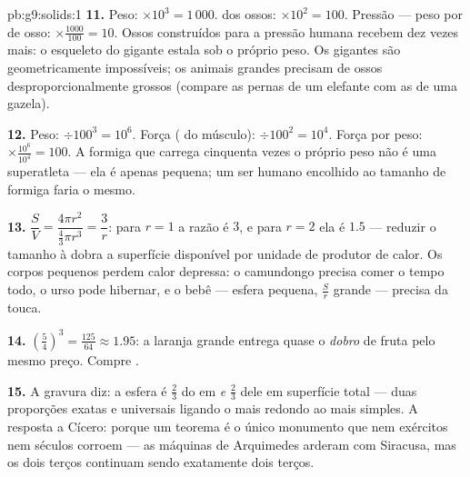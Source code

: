 \begin{solution}{pb:g9:solids:1}
\textbf{11.} Peso: $\times 10^3 = 1\,000$.  dos ossos:
$\times 10^2 = 100$. Pressão --- peso por  de osso:
$\times \frac{1000}{100} = 10$. Ossos construídos para a pressão humana
recebem dez vezes mais: o esqueleto do gigante estala sob o próprio
peso. Os gigantes são geometricamente impossíveis; os animais grandes
precisam de ossos desproporcionalmente grossos (compare as pernas de um
elefante com as de uma gazela).

\textbf{12.} Peso: $\div 100^3 = 10^6$. Força ( do
músculo): $\div 100^2 = 10^4$. Força por peso:
$\times \frac{10^6}{10^4} = 100$. A formiga que carrega cinquenta vezes
o próprio peso não é uma superatleta --- ela é apenas pequena; um ser
humano encolhido ao tamanho de formiga faria o mesmo.

\textbf{13.} $\dfrac{S}{V} = \dfrac{4\pi r^2}{\frac43\pi r^3}
= \dfrac{3}{r}$: para $r = 1$ a razão é $3$, e para $r = 2$ ela é
$1.5$ --- reduzir o tamanho à  dobra a superfície disponível por
unidade de  produtor de calor. Os corpos pequenos perdem calor
depressa: o camundongo precisa comer o tempo todo, o urso pode
hibernar, e o bebê --- esfera pequena, $\frac Sr$ grande --- precisa da
touca.

\textbf{14.} $\left(\frac54\right)^3 = \frac{125}{64} \approx 1.95$: a
laranja grande entrega quase o \emph{dobro} de fruta pelo mesmo preço.
Compre .

\textbf{15.} A gravura diz: a esfera é $\frac23$ do  em 
\emph{e} $\frac23$ dele em superfície total --- duas proporções
exatas e universais ligando o  mais redondo ao mais simples. A
resposta a Cícero: porque um teorema é o único monumento que nem
exércitos nem séculos corroem --- as máquinas de Arquimedes arderam com
Siracusa, mas os dois terços continuam sendo exatamente dois terços.
\end{solution}

